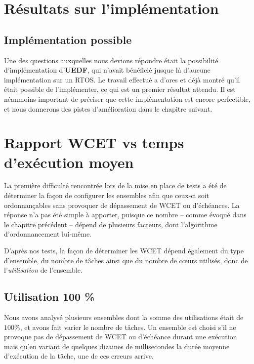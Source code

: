 
\section{Résultats sur l'implémentation}
\label{resultats}

	\subsection{Implémentation possible}
	
	Une des questions auxquelles nous devions répondre était la possibilité d'implémentation d'\textbf{UEDF}, qui 
	n'avait bénéficié jusque là d'aucune implémentation sur un RTOS.
	Le travail effectué a d'ores et déjà montré qu'il était possible de l'implémenter, ce qui est un premier résultat attendu.
	Il est néanmoins important de préciser que cette implémentation est encore 
	perfectible, et nous donnerons des pistes d'amélioration dans le chapitre suivant. \newline
	
\section{Rapport WCET vs temps d'exécution moyen}

	La première difficulté rencontrée lors de la mise en place de tests a été de déterminer la façon 
	de configurer les ensembles afin que ceux-ci soit ordonnançables sans provoquer de 
	dépassement de WCET ou d'échéances. La réponse n'a pas été simple à apporter, puisque ce nombre -- comme 
	évoqué dans le chapitre précédent --  dépend de plusieurs facteurs, dont 
	l'algorithme d'ordonnancement lui-même. \newline
	
	D'après nos tests, la façon de déterminer les WCET dépend également du type d'ensemble, du nombre de tâches 
	ainsi que du nombre de cœurs utilisés, donc de l'\textit{utilisation} de l'ensemble.\newline
	
	
	\subsection{Utilisation 100 \%}
	
	Nous avons analysé plusieurs ensembles dont la somme des utilisations était de $100\%$, et avons fait varier 
	le nombre de tâches. Un ensemble est choisi s'il ne provoque pas de dépassement de WCET ou d'échéance durant une exécution 
	mais qu'en variant de quelques dizaines de millisecondes la durée moyenne d'exécution de la tâche, une de ces erreurs arrive.\newline
	
